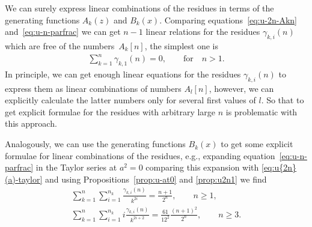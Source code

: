 \documentclass[pdftex]{sigma}
\numberwithin{equation}{section}
\begin{document}
\begin{Remark}We can surely express linear combinations of the residues in terms of the gene\-ra\-ting functions $A_k(z)$ and $B_k(x)$.
Comparing equations~\eqref{eq:u-2n-Akn} and~\eqref{eq:u-n-parfrac} we can get $n-1$ linear relations for the
residues $\gamma_{k,i}(n)$ which are free of the numbers~$A_k[n]$, the simplest one is
\begin{gather*}
\sum\limits_{k=1}^n\gamma_{k,1}(n)=0,\qquad \text{for}\quad n>1.
\end{gather*}
In principle, we can get enough linear equations for the residues $\gamma_{k,i}(n)$ to express them as linear combinations
of numbers $A_l[n]$, however, we can explicitly calculate the latter numbers only for several first values of $l$. So that
to get explicit formulae for the residues with arbitrary large $n$ is problematic with this approach.

Analogously, we can use the generating functions $B_k(x)$ to get some explicit formulae for linear combinations of the
residues, e.g., expanding equation~\eqref{eq:u-n-parfrac} in the Taylor series at $a^2=0$ comparing this expansion
with \eqref{eq:u{2n}(a)-taylor} and using Propositions~\ref{prop:u-at0} and \ref{prop:u2n1} we find
\begin{gather*}
\sum\limits_{k=1}^n\sum\limits_{i=1}^{n_k}\frac{\gamma_{k,i}(n)}{k^{2i}}=\frac{n+1}{2^n}, \qquad n\geq1,\\
\sum\limits_{k=1}^n\sum\limits_{i=1}^{n_k}i\frac{\gamma_{k,i}(n)}{k^{2i+2}}=\frac{61}{12^2}\frac{(n+1)^2}{2^n},\qquad n\geq3.
\end{gather*}
\end{Remark}
\end{document}
